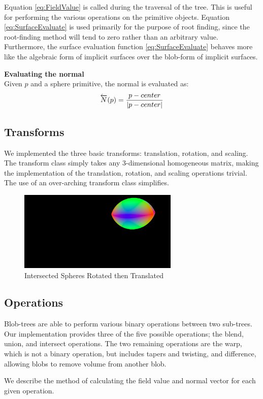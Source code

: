 \documentclass[conference]{acmsiggraph}
\begin{document}
Equation  \ref{eq:FieldValue} is called during the traversal of the tree. This
is useful for performing the various operations on the primitive objects.
Equation \ref{eq:SurfaceEvaluate} is used primarily for the purpose of root
finding, since the root-finding method will tend to zero rather than an
arbitrary value. Furthermore, the surface evaluation function
\ref{eq:SurfaceEvaluate} behaves more like the algebraic form of implicit
surfaces over the blob-form of implicit surfaces.


\textbf{Evaluating the normal}\\
Given $p$ and a sphere primitive, the normal is evaluated as:
$$ \overleftarrow{N}(p) = {p - center \over \lvert p - center \rvert}$$

\subsection{Transforms}
We implemented the three basic transforms: translation, rotation, and scaling.
The transform class simply takes any 3-dimensional homogeneous matrix, making
the implementation of the translation, rotation, and scaling operations
trivial. The use of an over-arching transform class simplifies.

\begin{figure}[htb]
	\centering
	\includegraphics[height=1.5in]{images/intersect_rotate.png}
	\caption{Intersected Spheres Rotated then Translated}
\end{figure}

\subsection{Operations}
Blob-trees are able to perform various binary operations between two
sub-trees. Our implementation provides three of the five possible operations;
the blend, union, and intersect operations. The two remaining operations are
the warp, which is not a binary operation, but includes tapers and twisting,
and difference, allowing blobs to remove volume from another blob.

We describe the method of calculating the field value and normal vector for
each given operation.
\end{document}

